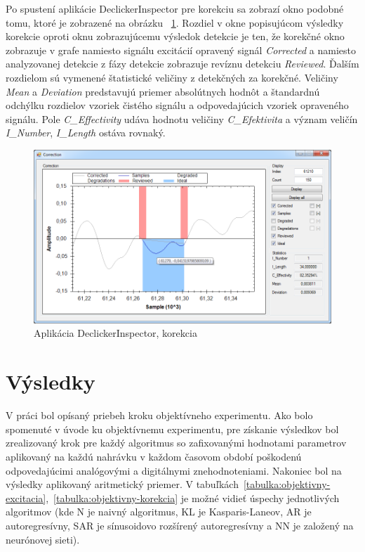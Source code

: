 Po spustení aplikácie DeclickerInspector pre korekciu sa zobrazí okno podobné tomu, ktoré je zobrazené na obrázku ~\ref{obrazok:inspector-korekcia}. Rozdiel v okne popisujúcom výsledky korekcie oproti oknu zobrazujúcemu výsledok detekcie je ten, že korekčné okno zobrazuje v grafe namiesto signálu excitácií opravený signál \textit{Corrected} a namiesto analyzovanej detekcie z fázy detekcie zobrazuje revíznu detekciu \textit{Reviewed}. Ďalším rozdielom sú vymenené štatistické veličiny z detekčných za korekčné. Veličiny \textit{Mean} a \textit{Deviation} predstavujú priemer absolútnych hodnôt a štandardnú odchýlku rozdielov vzoriek čistého signálu a odpovedajúcich vzoriek opraveného signálu. Pole \textit{C\_Effectivity} udáva hodnotu veličiny \textit{C\_Efektivita} a význam veličín \textit{I\_Number}, \textit{I\_Length} ostáva rovnaký.

\begin{figure}[!h]
\centering
\includegraphics[width=1.0\textwidth]{images/korekcia.png}
\caption{Aplikácia DeclickerInspector, korekcia}
\label{obrazok:inspector-korekcia}
\end{figure}

\section{Výsledky}
V práci bol opísaný priebeh kroku objektívneho experimentu. Ako bolo spomenuté v úvode ku objektívnemu experimentu, pre získanie výsledkov bol zrealizovaný krok pre každý algoritmus so zafixovanými hodnotami parametrov aplikovaný na každú nahrávku v každom časovom období poškodenú odpovedajúcimi analógovými a digitálnymi znehodnoteniami. Nakoniec bol na výsledky aplikovaný aritmetický priemer. V tabuľkách~\ref{tabulka:objektivny-excitacia},~\ref{tabulka:objektivny-korekcia} je možné vidieť úspechy jednotlivých algoritmov (kde N je naivný algoritmus, KL je Kasparis-Laneov, AR je autoregresívny, SAR je sínusoidovo rozšírený autoregresívny a NN je založený na neurónovej sieti).

